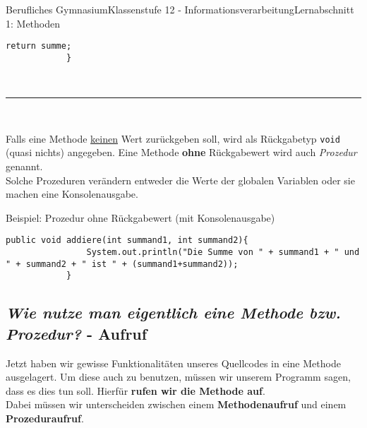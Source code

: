 \documentclass[11pt,oneside,openany,headings=optiontotoc,11pt,numbers=noenddot]{article}
\begin{document}
\begin{worksheet}{Berufliches Gymnasium}{Klassenstufe 12 - Informationsverarbeitung}{Lernabschnitt 1: Methoden}
\begin{minipage}[t]{0.48\textwidth}
\begin{lstlisting}[style=JavaInputStyle,frame=single]
				return summe;
			}
			\end{lstlisting}
		\end{minipage}\\
		\par\noindent
		\rule{\textwidth}{0.1pt}\\
		\par\noindent
		Falls eine Methode \underline{keinen} Wert zurückgeben soll, wird als Rückgabetyp \lstinline[style=JavaInputStyle]|void| (quasi \grqq{}nichts\grqq{}) angegeben. Eine Methode \textbf{ohne} Rückgabewert wird auch \textit{Prozedur} genannt.\\
		Solche Prozeduren verändern entweder die Werte der globalen Variablen oder sie machen eine Konsolenausgabe.\\
		\begin{minipage}[t]{\textwidth}
			\vspace*{0pt}
			Beispiel: Prozedur ohne Rückgabewert (mit Konsolenausgabe)
			\begin{lstlisting}[style=JavaInputStyle,frame=single]
			public void addiere(int summand1, int summand2){
				System.out.println("Die Summe von " + summand1 + " und " + summand2 + " ist " + (summand1+summand2));
			}
			\end{lstlisting}
		\end{minipage}
		\subsection{\textit{Wie nutze man eigentlich eine Methode bzw. Prozedur?} - Aufruf}
		Jetzt haben wir gewisse Funktionalitäten unseres Quellcodes in eine Methode ausgelagert. Um diese auch zu benutzen, müssen wir unserem Programm sagen, dass es dies tun soll. Hierfür \textbf{rufen wir die Methode auf}.\\
		Dabei müssen wir unterscheiden zwischen einem \textbf{Methodenaufruf} und einem \textbf{Prozeduraufruf}.

\end{worksheet}
\end{document}
